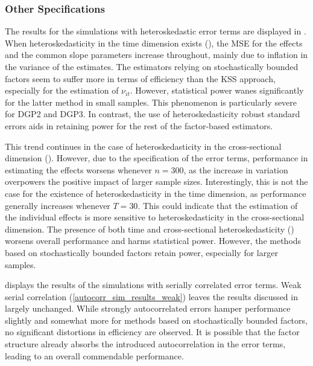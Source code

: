 \subsubsection{Other Specifications}

The results for the simulations with heteroskedastic error terms are displayed in . When heteroskedasticity in the time dimension exists (), the \ac{MSE} for the effects and the common slope parameters increase throughout, mainly due to inflation in the variance of the estimates. The estimators relying on stochastically bounded factors seem to suffer more in terms of efficiency than the \ac{KSS} approach, especially for the estimation of $\nu_{it}$. However, statistical power wanes significantly for the latter method in small samples. This phenomenon is particularly severe for \ac{DGP}2 and \ac{DGP}3. In contrast, the use of heteroskedasticity robust standard errors aids in retaining power for the rest of the factor-based estimators. 


This trend continues in the case of heteroskedasticity in the cross-sectional dimension (). However, due to the specification of the error terms, performance in estimating the effects worsens whenever $n = 300$, as the increase in variation overpowers the positive impact of larger sample sizes. Interestingly, this is not the case for the existence of heteroskedasticity in the time dimension, as performance generally increases whenever $T = 30$. This could indicate that the estimation of the individual effects is more sensitive to heteroskedasticity in the cross-sectional dimension. The presence of both time and cross-sectional heteroskedasticity ()  worsens overall performance and harms statistical power. However, the methods based on stochastically bounded factors retain power, especially for larger samples. 


 displays the results of the simulations with serially correlated error terms. Weak serial correlation (\cref{autocorr_sim_results_weak}) leaves the results discussed in  largely unchanged. While strongly autocorrelated errors hamper performance slightly and somewhat more for methods based on stochastically bounded factors, no significant distortions in efficiency are observed. It is possible that the factor structure already absorbs the introduced autocorrelation in the error terms, leading to an overall commendable performance.





